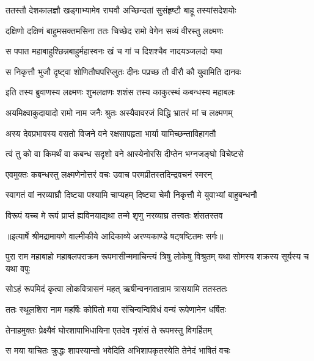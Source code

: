 \twolineshloka
{ततस्तौ देशकालज्ञौ खड्गाभ्यामेव राघवौ}
{अच्छिन्दतां सुसंहृष्टौ बाहू तस्यांसदेशयोः} %

\twolineshloka
{दक्षिणो दक्षिणं बाहुमसक्तमसिना ततः}
{चिच्छेद रामो वेगेन सव्यं वीरस्तु लक्ष्मणः} %

\twolineshloka
{स पपात महाबाहुश्छिन्नबाहुर्महास्वनः}
{खं च गां च दिशश्चैव नादयञ्जलदो यथा} %

\twolineshloka
{स निकृत्तौ भुजौ दृष्ट्वा शोणितौघपरिप्लुतः}
{दीनः पप्रच्छ तौ वीरौ कौ युवामिति दानवः} %

\twolineshloka
{इति तस्य ब्रुवाणस्य लक्ष्मणः शुभलक्षणः}
{शशंस तस्य काकुत्स्थं कबन्धस्य महाबलः} %

\twolineshloka
{अयमिक्ष्वाकुदायादो रामो नाम जनैः श्रुतः}
{अस्यैवावरजं विद्धि भ्रातरं मां च लक्ष्मणम्} %

\twolineshloka
{अस्य देवप्रभावस्य वसतो विजने वने}
{रक्षसापहृता भार्या यामिच्छन्ताविहागतौ} %

\twolineshloka
{त्वं तु को वा किमर्थं वा कबन्ध सदृशो वने}
{आस्येनोरसि दीप्तेन भग्नजङ्घो विचेष्टसे} %

\twolineshloka
{एवमुक्तः कबन्धस्तु लक्ष्मणेनोत्तरं वचः}
{उवाच परमप्रीतस्तदिन्द्रवचनं स्मरन्} %

\twolineshloka
{स्वागतं वां नरव्याघ्रौ दिष्ट्या पश्यामि चाप्यहम्}
{दिष्ट्या चेमौ निकृत्तौ मे युवाभ्यां बाहुबन्धनौ} %

\twolineshloka
{विरूपं यच्च मे रूपं प्राप्तं ह्यविनयाद्यथा}
{तन्मे शृणु नरव्याघ्र तत्त्वतः शंसतस्तव} %


{॥इत्यार्षे श्रीमद्रामायणे वाल्मीकीये आदिकाव्ये अरण्यकाण्डे षट्षष्टितमः सर्गः॥}


\threelineshloka
{पुरा राम महाबाहो महाबलपराक्रम}
{रूपमासीन्ममाचिन्त्यं त्रिषु लोकेषु विश्रुतम्}
{यथा सोमस्य शक्रस्य सूर्यस्य च यथा वपुः} %

\twolineshloka
{सोऽहं रूपमिदं कृत्वा लोकवित्रासनं महत्}
{ऋषीन्वनगतान्राम त्रासयामि ततस्ततः} %

\twolineshloka
{ततः स्थूलशिरा नाम महर्षिः कोपितो मया}
{संचिन्वन्विविधं वन्यं रूपेणानेन धर्षितः} %

\twolineshloka
{तेनाहमुक्तः प्रेक्ष्यैवं घोरशापाभिधायिना}
{एतदेव नृशंसं ते रूपमस्तु विगर्हितम्} %

\twolineshloka
{स मया याचितः क्रुद्धः शापस्यान्तो भवेदिति}
{अभिशापकृतस्येति तेनेदं भाषितं वचः} %

